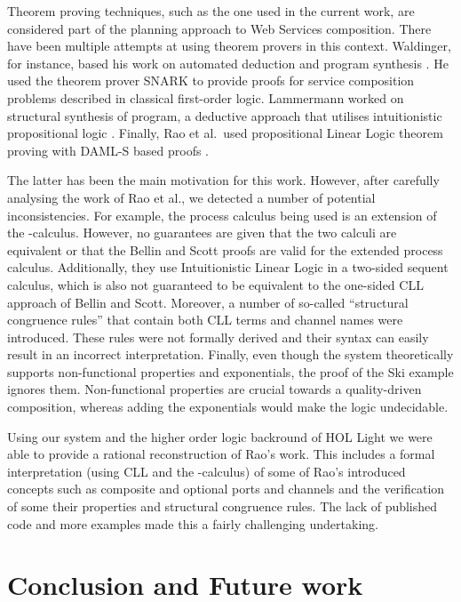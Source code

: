 \documentclass[copyright,creativecommons]{eptcs}
\begin{document}
Theorem proving techniques, such as the one used in the current work, are considered part of the planning approach to Web Services composition. There have been multiple attempts at using theorem provers in this context. Waldinger, for instance, based his work on automated deduction and program synthesis \cite{waldinger2001wac}. He used the theorem prover SNARK \cite{stickel2000guide} to provide proofs for service composition problems described in classical first-order logic. Lammermann worked on structural synthesis of program, a deductive approach that utilises intuitionistic propositional logic \cite{lammermann2002rsc}. Finally, Rao et al.\ used propositional Linear Logic theorem proving with DAML-S based proofs \cite{rao-semantic,rao2006composition}. 

The latter has been the main motivation for this work. However, after carefully analysing the work of Rao et al., we detected a number of potential inconsistencies. For example, the process calculus being used is an extension of the -calculus. However, no guarantees are given that the two calculi are equivalent or that the Bellin and Scott proofs are valid for the extended process calculus. Additionally, they use Intuitionistic Linear Logic in a two-sided sequent calculus, which is also not guaranteed to be equivalent to the one-sided CLL approach of Bellin and Scott. Moreover, a number of so-called ``structural congruence rules'' that contain both CLL terms and channel names were introduced. These rules were not formally derived and their syntax can easily result in an incorrect interpretation. Finally, even though the system theoretically supports non-functional properties and exponentials, the proof of the Ski example ignores them. Non-functional properties are crucial towards a quality-driven composition, whereas adding the exponentials would make the logic undecidable. 

Using our system and the higher order logic backround of HOL Light we were able to provide a rational reconstruction of Rao's work. This includes a formal interpretation (using CLL and the -calculus) of some of Rao's introduced concepts such as composite and optional ports and channels and the verification of some their properties and structural congruence rules. The lack of published code and more examples made this a fairly challenging undertaking.

\section{Conclusion and Future work}
\label{conclusion}
\end{document}
